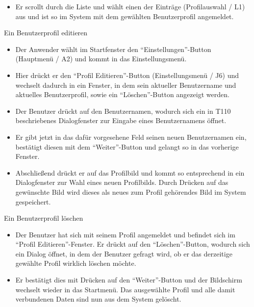 \begin{requirements}
\begin{itemize}
  			\item Er scrollt durch die Liste und wählt einen der Einträge (Profilauswahl / L1) aus und ist so im System mit dem gewählten Benutzerprofil angemeldet.
  			
	\end{itemize}
  	
  	
	
	 Ein Benutzerprofil editieren
	
	
	\begin{itemize}
  			\item Der Anwender wählt im Startfenster den "`Einstellungen"'-Button (Hauptmenü / A2) und kommt in das Einstellungsmenü.
  			
  			\item Hier drückt er den "`Profil Editieren"'-Button (Einstellungsmenü / J6) und wechselt dadurch in ein Fenster, in dem sein aktueller Benutzername und aktuelles Benutzerprofil, sowie ein "`Löschen"'-Button angezeigt werden.
  			
  			\item Der Benutzer drückt auf den Benutzernamen, wodurch sich ein in T110 beschriebenes Dialogfenster zur Eingabe eines Benutzernamens öffnet.
  			
  			\item Er gibt jetzt in das dafür vorgesehene Feld seinen neuen Benutzernamen ein, bestätigt diesen mit dem "`Weiter"'-Button und gelangt so in das vorherige Fenster.
  			
  			\item Abschließend drückt er auf das Profilbild und kommt so entsprechend in ein Dialogfenster zur Wahl eines neuen Profilbilds. Durch Drücken auf das gewünschte Bild wird dieses als neues zum Profil gehörendes Bild im System gespeichert.
  			
  			
  	\end{itemize}

  	
	
	
	 Ein Benutzerprofil löschen
	
	
	\begin{itemize}
  			\item Der Benutzer hat sich mit seinem Profil angemeldet und befindet sich im "`Profil Editieren"'-Fenster.
			Er drückt auf den "`Löschen"'-Button, wodurch sich ein Dialog öffnet, in dem der Benutzer gefragt wird, ob er das derzeitige gewählte Profil wirklich löschen möchte.
  			
  			\item Er bestätigt dies mit Drücken auf den "`Weiter"'-Button und der Bildschirm wechselt wieder in das Startmenü. Das ausgewählte Profil und alle damit verbundenen Daten sind nun aus dem System gelöscht.
  			

\end{itemize}
\end{requirements}
